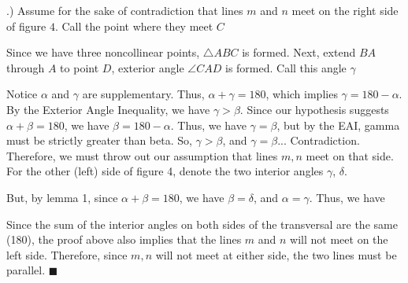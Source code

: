 \documentclass{report}
\begin{document}
    \bigbreak {}.) Assume for the sake of contradiction that lines $m$ and $n$ meet on the right side of figure $4$. Call the point where they meet $C$
    \bigbreak \noindent 
    \begin{figure}[ht]
        \centering
        \label{fig:fig6}
    \end{figure}
    \fc{}
    \bigbreak \noindent 
    Since we have three noncollinear points, $\triangle ABC$ is formed. Next, extend $BA$ through $A$ to point $D$, exterior angle $\angle CAD$ is formed. Call this angle $\gamma$
    \bigbreak \noindent 
    \begin{figure}[ht]
        \centering
        \label{fig:fig7}
    \end{figure}
    \bigbreak \noindent 
    Notice $\alpha$ and $\gamma$ are supplementary. Thus, $\alpha + \gamma = 180$, which implies $\gamma = 180 - \alpha $. By the Exterior Angle Inequality, we have $\gamma > \beta$. Since our hypothesis suggests $\alpha + \beta = 180$, we have $\beta = 180 -\alpha$. Thus, we have $\gamma = \beta$, but by the EAI, gamma must be strictly greater than beta. So, $\gamma > \beta$, and $\gamma = \beta$... Contradiction.
    \bigbreak \noindent 
    Therefore, we must throw out our assumption that lines $m,n$ meet on that side.
    \bigbreak \noindent 
    For the other (left) side of figure 4, denote the two interior angles $\gamma$, $\delta$.
    \pagebreak \bigbreak \noindent 
    \begin{figure}[ht]
        \centering
        \label{fig:delta}
    \end{figure}
    \bigbreak \noindent 
    But, by lemma 1, since $\alpha + \beta = 180$, we have $\beta = \delta$, and $\alpha = \gamma$. Thus, we have
    \bigbreak \noindent 
    \begin{figure}[ht]
        \centering
        \label{fig:gamma}
    \end{figure}
    \bigbreak \noindent 
    Since the sum of the interior angles on both sides of the transversal are the same (180), the proof above also implies that the lines $m$ and $n$ will not meet on the left side. 
    \bigbreak \noindent 
    Therefore, since $m,n$ will not meet at either side, the two lines must be parallel. \hspace*{\fill} $\blacksquare $
\end{document}
